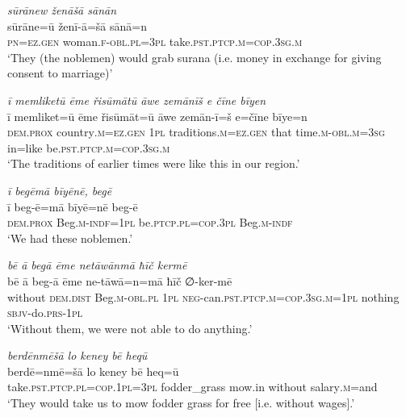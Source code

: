 \ea \label{RE.59}
\textit{sūrānew ženāšā sānān} \\ 
\gll sūrāne=ū ženī-ā=šā sānā=n \\ 
 \textsc{pn}\textsc{=ez.gen} woman\textsc{.f}\textsc{-obl}\textsc{.pl}\textsc{=3pl} take\textsc{.pst}\textsc{.ptcp}\textsc{.m}\textsc{=cop}\textsc{.3sg}\textsc{.m} \\ 
\glt `They (the noblemen) would grab surana (i.e. money in exchange for giving consent to marriage)'
\z 
 
\ea \label{RE.62}
\textit{ī memliketū ēme řisūmātū āwe zemānīš e čīne bīyen} \\ 
\gll ī memliket=ū ēme řisūmāt=ū āwe zemān-ī=š e=čīne bīye=n \\ 
 \textsc{dem.prox} country\textsc{.m}\textsc{=ez.gen} \textsc{1pl} traditions\textsc{.m}\textsc{=ez.gen} that time\textsc{.m}\textsc{-obl}\textsc{.m}\textsc{=3sg} in=like be\textsc{.pst}\textsc{.ptcp}\textsc{.m}\textsc{=cop}\textsc{.3sg}\textsc{.m} \\ 
\glt `The traditions of earlier times were like this in our region.'
\z 
 
\ea \label{RE.63}
\textit{ī begēmā bīyēnē, begē} \\ 
\gll ī beg-ē=mā bīyē=nē beg-ē \\ 
 \textsc{dem.prox} Beg\textsc{.m}\textsc{-indf}\textsc{=\textsc{1pl}} be\textsc{.ptcp}\textsc{.pl}\textsc{=cop}\textsc{.3pl} Beg\textsc{.m}\textsc{-indf} \\ 
\glt `We had these noblemen.'
\z 
 
\ea \label{RE.64}
\textit{bē ā begā ēme netāwānmā ħīč kermē} \\ 
\gll bē ā beg-ā ēme ne-tāwā=n=mā ħīč ∅-ker-mē \\ 
 without \textsc{dem.dist} Beg\textsc{.m}\textsc{-obl}\textsc{.pl} \textsc{1pl} \textsc{neg-}can\textsc{.pst}\textsc{.ptcp}\textsc{.m}\textsc{=cop}\textsc{.3sg}\textsc{.m}\textsc{=\textsc{1pl}} nothing \textsc{sbjv-}do\textsc{.prs}\textsc{-\textsc{1pl}} \\ 
\glt `Without them, we were not able to do anything.'
\z 
 
\ea \label{RE.65}
\textit{berdēnmēšā lo keney bē heqū} \\ 
\gll berdē=nmē=šā lo keney bē heq=ū \\ 
 take\textsc{.pst}\textsc{.ptcp}\textsc{.pl}\textsc{=cop}\textsc{.\textsc{1pl}}\textsc{=3pl} fodder\_grass mow.in without salary\textsc{.m}=and \\ 
\glt `They would take us to mow fodder grass for free [i.e. without wages].'
\z 
 
